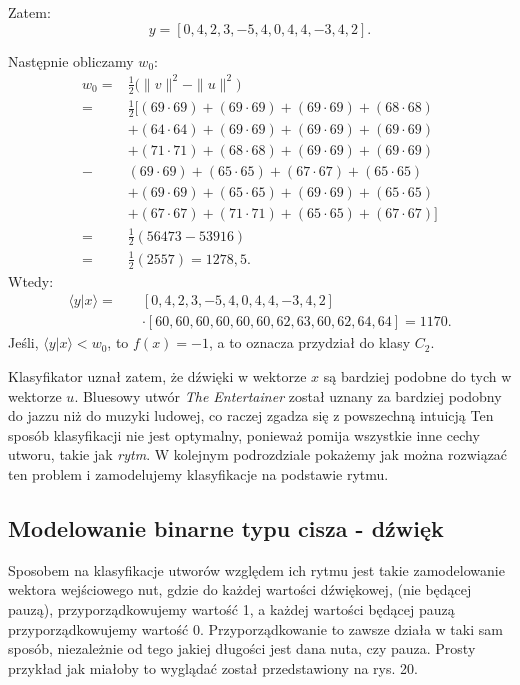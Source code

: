 Zatem:
\begin{equation*}
y =  [0, 4, 2, 3, -5, 4, 0, 4, 4, -3, 4, 2].
\end{equation*}

Następnie obliczamy $w_{0}$:
\begin{align*}
w_{0} = &  \frac{1}{2} \big(\|v\|^{2} - \|u\|^{2}\big)  \\
= & \frac{1}{2}[(69 \cdot 69) + (69 \cdot 69) + (69 \cdot 69) + (68 \cdot 68) \\
 & + (64 \cdot 64) + (69 \cdot 69) + (69 \cdot 69) + (69 \cdot 69) \\
 & + (71 \cdot 71) + (68 \cdot 68)  + (69 \cdot 69) + (69 \cdot 69) \\
 - & (69 \cdot 69) + (65 \cdot 65) + (67 \cdot 67) + (65 \cdot 65) \\
 & + (69 \cdot 69) + (65 \cdot 65) + (69 \cdot 69) + (65 \cdot 65) \\
 & + (67 \cdot 67) + (71 \cdot 71) + (65 \cdot 65) + (67 \cdot 67)] \\
 = & \frac{1}{2}(56473 - 53916) \\
 = & \frac{1}{2}(2557) = 1278,5.
\end{align*}
Wtedy:
\begin{align*}
\big \langle y|x  \big \rangle  = \quad 
& [0, 4, 2, 3, -5, 4, 0, 4, 4, -3, 4, 2] \\ 
&\cdot
[60,60,60,60,60,60,62,63,60,62,64,64] 
= 1170.
\end{align*}
Jeśli, $\big \langle y|x \big \rangle < w_{0}$, to $f(x) = -1$, a to oznacza przydział do klasy $C_{2}$.

Klasyfikator uznał zatem, że dźwięki w wektorze $x$ są bardziej podobne do tych w wektorze $u$. Bluesowy utwór \textit{The Entertainer} został uznany za bardziej podobny do jazzu niż do muzyki ludowej, co raczej zgadza się z powszechną intuicją Ten sposób klasyfikacji nie jest optymalny, ponieważ pomija wszystkie inne cechy utworu, takie jak \textit{rytm}. W kolejnym podrozdziale pokażemy jak można rozwiązać ten problem i zamodelujemy klasyfikacje na podstawie rytmu.

\subsection{Modelowanie binarne typu cisza - dźwięk}

Sposobem na klasyfikacje utworów względem ich rytmu jest takie zamodelowanie wektora wejściowego nut, gdzie do każdej wartości dźwiękowej, (nie będącej pauzą), przyporządkowujemy wartość 1, a każdej wartości będącej pauzą przyporządkowujemy wartość 0. Przyporządkowanie to zawsze działa w taki sam sposób, niezależnie od tego jakiej długości jest dana nuta, czy pauza. Prosty przykład jak miałoby to wyglądać został przedstawiony na rys. 20.

